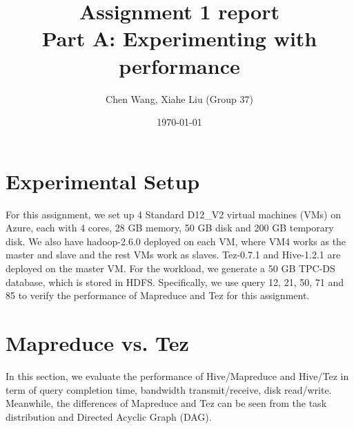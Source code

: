 \documentclass[10pt]{article}
\title{Assignment 1 report \\ Part A: Experimenting with performance} %
\author{Chen Wang, Xiahe Liu (Group 37)} %
\date{\today} %
\begin{document}
\maketitle %




\section{Experimental Setup}

For this assignment, we set up 4 Standard D12\_V2 virtual machines (VMs) on Azure, each with 4 cores, 28 GB memory, 50 GB disk and 200 GB temporary disk. We also have hadoop-2.6.0 deployed on each VM, where VM4 works as the master and slave and the rest VMs work as slaves. Tez-0.7.1 and Hive-1.2.1 are deployed on the master VM. For the workload, we generate a 50 GB TPC-DS database, which is stored in HDFS. Specifically, we use query 12, 21, 50, 71 and 85 to verify the performance of Mapreduce and Tez for this assignment. 


\section{Mapreduce vs. Tez}
In this section, we evaluate the performance of Hive/Mapreduce and Hive/Tez in term of query completion time, bandwidth transmit/receive, disk read/write. Meanwhile, the differences of Mapreduce and Tez can be seen from the task distribution and Directed Acyclic Graph (DAG).
\end{document}

